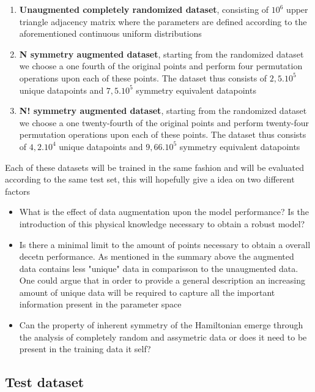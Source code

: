 \documentclass[]{article}
\begin{document}
\begin{enumerate}
	\item \textbf{Unaugmented completely randomized dataset}, consisting of $10^6$ upper triangle adjacency matrix where the parameters are defined according to the aforementioned continuous uniform distributions
	\item \textbf{N symmetry augmented dataset}, starting from the randomized dataset we choose a one fourth of the original points and perform four permutation operations upon each of these points. The dataset thus consists of $2,5.10^5$ unique datapoints and $7,5.10^5$ symmetry equivalent datapoints
	\item \textbf{N! symmetry augmented dataset}, starting from the randomized dataset we choose a one twenty-fourth of the original points and perform twenty-four permutation operations upon each of these points. The dataset thus consists of $4,2.10^4$ unique datapoints and $9,66.10^5$ symmetry equivalent datapoints
\end{enumerate}
Each of these datasets will be trained in the same fashion and will be evaluated according to the same test set, this will hopefully give a idea on two different factors
\begin{itemize}
	\item What is the effect of data augmentation upon the model performance? Is the introduction of this physical knowledge necessary to obtain a robust model?
	\item Is there a minimal limit to the amount of points necessary to obtain a overall decetn performance. As mentioned in the summary above the augmented data contains less "unique" data in comparisson to the unaugmented data. One could argue that in order to provide a general description an increasing amount of unique data will be required to capture all the important information present in the parameter space
	\item Can the property of inherent symmetry of the Hamiltonian emerge through the analysis of completely random and assymetric data or does it need to be present in the training data it self? 
\end{itemize}

\subsection{Test dataset}
\end{document}
